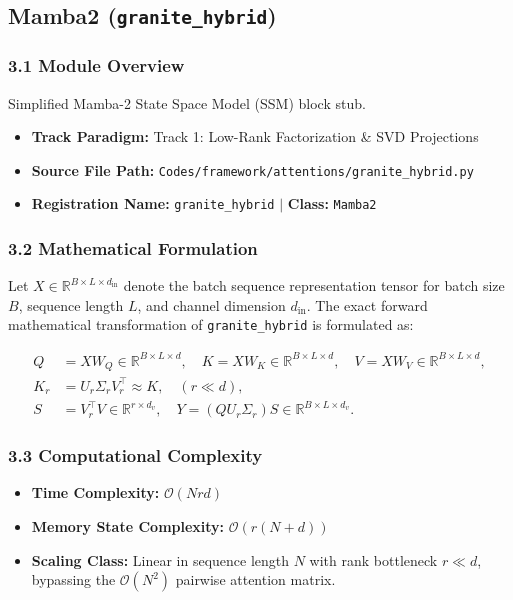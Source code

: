 \subsection{Mamba2 (\texttt{granite\_hybrid})}
\label{sec:app_module_granite_hybrid}

\subsubsection*{3.1 Module Overview}
Simplified Mamba-2 State Space Model (SSM) block stub.
\begin{itemize}
    \item \textbf{Track Paradigm:} Track 1: Low-Rank Factorization \& SVD Projections
    \item \textbf{Source File Path:} \texttt{Codes/framework/attentions/granite\_hybrid.py}
    \item \textbf{Registration Name:} \texttt{granite\_hybrid} $\mid$ \textbf{Class:} \texttt{Mamba2}
\end{itemize}

\subsubsection*{3.2 Mathematical Formulation}
Let $X \in \mathbb{R}^{B \times L \times d_{\text{in}}}$ denote the batch sequence representation tensor for batch size $B$, sequence length $L$, and channel dimension $d_{\text{in}}$. The exact forward mathematical transformation of \texttt{granite\_hybrid} is formulated as:

\begin{align}
Q &= X W_Q \in \mathbb{R}^{B \times L \times d}, \quad K = X W_K \in \mathbb{R}^{B \times L \times d}, \quad V = X W_V \in \mathbb{R}^{B \times L \times d}, \\
K_r &= U_r \Sigma_r V_r^\top \approx K, \quad (r \ll d), \\
S &= V_r^\top V \in \mathbb{R}^{r \times d_v}, \quad Y = (Q U_r \Sigma_r) S \in \mathbb{R}^{B \times L \times d_v}.
\end{align}


\subsubsection*{3.3 Computational Complexity}
\begin{itemize}
    \item \textbf{Time Complexity:} $\mathcal{O}(N r d)$
    \item \textbf{Memory State Complexity:} $\mathcal{O}(r(N + d))$
    \item \textbf{Scaling Class:} Linear in sequence length $N$ with rank bottleneck $r \ll d$, bypassing the $\mathcal{O}(N^2)$ pairwise attention matrix.
\end{itemize}


